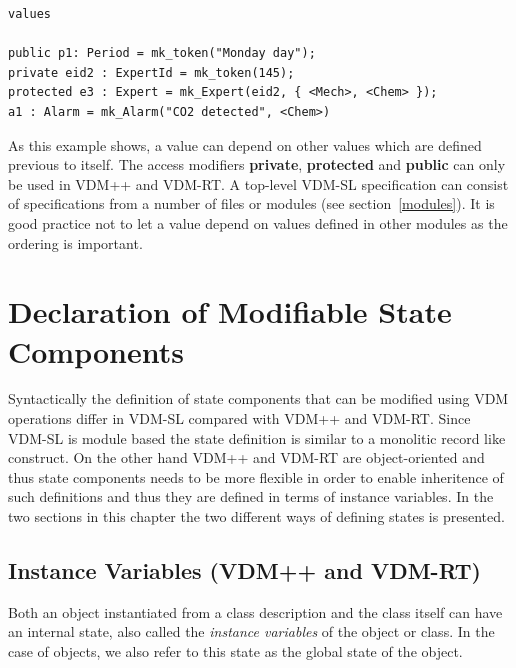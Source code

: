 \documentclass{overturerepchap}
\newcommand{\keyw}[1]{{\bf\ttfamily #1}}
\begin{document}
\begin{description}
\begin{lstlisting}
values
 
public p1: Period = mk_token("Monday day");
private eid2 : ExpertId = mk_token(145);
protected e3 : Expert = mk_Expert(eid2, { <Mech>, <Chem> });
a1 : Alarm = mk_Alarm("CO2 detected", <Chem>)
\end{lstlisting}
  As this example shows, a value can depend on other values which are
  defined previous to itself. The access modifiers \keyw{private},
  \keyw{protected} and \keyw{public} can only be used in VDM++ and VDM-RT.
  A top-level VDM-SL specification can consist of
  specifications from a number of files or modules (see
  section~\ref{modules}).  It is good practice not to let a value depend
  on values defined in other modules as the ordering is important.
\end{description}

\chapter{Declaration of Modifiable State Components}\label{chap:state}

Syntactically the definition of state components that can be modified
using VDM operations differ in VDM-SL compared with VDM++ and
VDM-RT. Since VDM-SL is module based the state definition is similar
to a monolitic record like construct. On the other hand VDM++ and
VDM-RT are object-oriented and thus state components needs to be more
flexible in order to enable inheritence of such definitions and thus
they are defined in terms of instance variables. In the two sections
in this chapter the two different ways of defining states is presented.

\section{Instance Variables (VDM++ and VDM-RT)}
\label{sec:ivars}

Both an object instantiated from a class description and the class
itself can have an internal state, also called the \emph{instance
  variables} of the object or class. In the case of objects, we also
refer to this state as the global state of the object.
\end{document}
